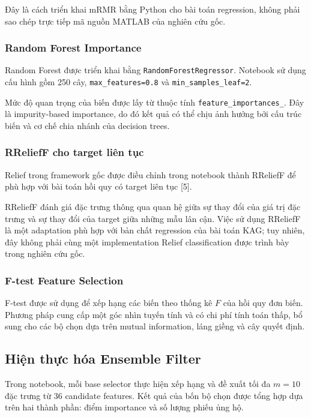 Đây là cách triển khai mRMR bằng Python cho bài toán regression,
không phải sao chép trực tiếp mã nguồn MATLAB của nghiên cứu gốc.

\subsubsection{Random Forest Importance}

Random Forest được triển khai bằng
\texttt{RandomForestRegressor}. Notebook sử dụng cấu hình gồm
250 cây, \texttt{max\_features=0.8} và
\texttt{min\_samples\_leaf=2}.

Mức độ quan trọng của biến được lấy từ thuộc tính
\texttt{feature\_importances\_}. Đây là impurity-based importance,
do đó kết quả có thể chịu ảnh hưởng bởi cấu trúc biến và cơ chế
chia nhánh của decision trees.

\subsubsection{RReliefF cho target liên tục}

Relief trong framework gốc được điều chỉnh trong notebook thành
RReliefF để phù hợp với bài toán hồi quy có target liên tục [5].

RReliefF đánh giá đặc trưng thông qua quan hệ giữa sự thay đổi
của giá trị đặc trưng và sự thay đổi của target giữa những mẫu
lân cận. Việc sử dụng RReliefF là một adaptation phù hợp với
bản chất regression của bài toán KAG; tuy nhiên, đây không phải
cùng một implementation Relief classification được trình bày
trong nghiên cứu gốc.

\subsubsection{F-test Feature Selection}

F-test được sử dụng để xếp hạng các biến theo thống kê $F$
của hồi quy đơn biến. Phương pháp cung cấp một góc nhìn tuyến tính
và có chi phí tính toán thấp, bổ sung cho các bộ chọn dựa trên
mutual information, láng giềng và cây quyết định.

\subsection{Hiện thực hóa Ensemble Filter}
\label{subsec:implemented-ensemble-filter}

Trong notebook, mỗi base selector thực hiện xếp hạng và đề xuất
tối đa $m=10$ đặc trưng từ 36 candidate features. Kết quả của
bốn bộ chọn được tổng hợp dựa trên hai thành phần: điểm importance
và số lượng phiếu ủng hộ.

